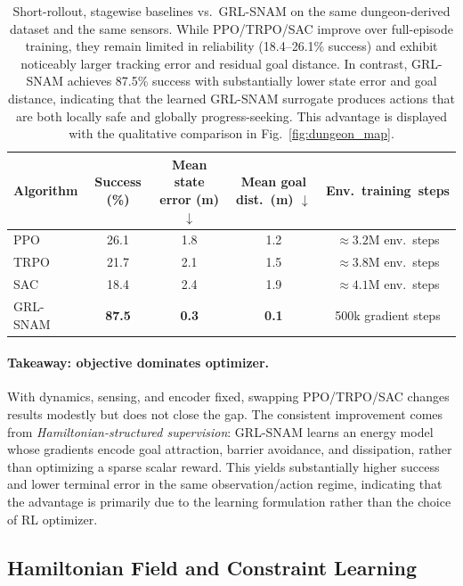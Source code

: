 \begin{table}[htbp]
\centering
\caption[Stagewise short-rollout baselines vs.\ GRL-SNAM]{
Short-rollout, stagewise baselines vs.\ GRL-SNAM on the same dungeon-derived dataset and the same sensors.
While PPO/TRPO/SAC improve over full-episode training, they remain limited in reliability
(18.4--26.1\% success) and exhibit noticeably larger tracking error and residual goal distance.
In contrast, GRL-SNAM achieves 87.5\% success with substantially lower state error and goal distance, indicating that the learned GRL-SNAM surrogate produces actions that are both locally safe and globally progress-seeking. This advantage is displayed with the qualitative comparison in Fig.~\ref{fig:dungeon_map}.%
}

\small
\begin{tabular}{lcccc}
\toprule
Algorithm & Success (\%) & Mean state error (m) $\downarrow$ & Mean goal dist.\ (m) $\downarrow$ & Env.\ training\ steps \\
\midrule
PPO      & 26.1 & 1.8 & 1.2 & $\approx 3.2$M env.\ steps \\
TRPO     & 21.7 & 2.1 & 1.5 & $\approx 3.8$M env.\ steps \\
SAC      & 18.4 & 2.4 & 1.9 & $\approx 4.1$M env.\ steps \\
GRL-SNAM & \textbf{87.5} & \textbf{0.3} & \textbf{0.1} & 500k gradient steps \\
\bottomrule
\end{tabular}
\label{tab:short_rollout_rl}
\end{table}

\paragraph{Takeaway: objective dominates optimizer.}
With dynamics, sensing, and encoder fixed, swapping PPO/TRPO/SAC changes results modestly but does not close the gap.
The consistent improvement comes from \emph{Hamiltonian-structured supervision}: GRL-SNAM learns an energy model whose gradients encode goal attraction, barrier avoidance, and dissipation, rather than optimizing a sparse scalar reward.
This yields substantially higher success and lower terminal error in the same observation/action regime, indicating that the advantage is primarily due to the learning formulation rather than the choice of RL optimizer.


\subsection{Hamiltonian Field and Constraint Learning}
\label{subsec:hamiltonian_analysis}

